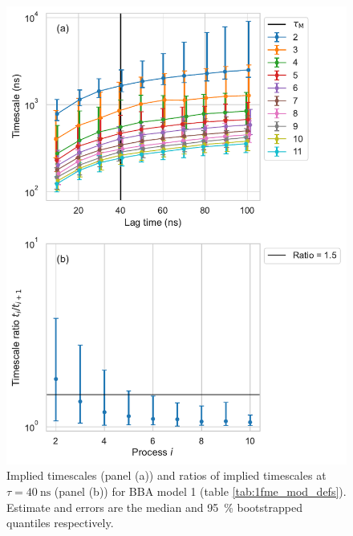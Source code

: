 \documentclass{article}
\begin{document}
\begin{figure}[h]
    \centering
    \includegraphics[height=0.65\textheight]{figures/its/bba/BBA_model_dihed._method_m1.pdf}
    \caption{Implied timescales (panel (a)) and ratios of implied timescales at $\tau=\SI{40}{\nano\second}$ (panel (b)) for BBA model 1 (table \ref{tab:1fme_mod_defs}). Estimate and errors are the median and \SI{95}{\percent} bootstrapped quantiles respectively.}
    \label{fig:its_bba_1}
\end{figure}
\end{document}

